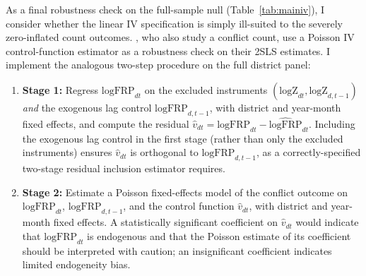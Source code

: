 \documentclass[12pt]{article}
\begin{document}
As a final robustness check on the full-sample null (Table~\ref{tab:mainiv}), I consider whether the linear IV specification is simply ill-suited to the severely zero-inflated count outcomes. \citet{lu2023fish}, who also study a conflict count, use a Poisson IV control-function estimator \citep{terzabasurathouz2008} as a robustness check on their 2SLS estimates. I implement the analogous two-step procedure on the full district panel:

\begin{enumerate}
    \item \textbf{Stage 1:} Regress $\text{logFRP}_{dt}$ on the excluded instruments $(\text{logZ}_{dt}, \text{logZ}_{d,t-1})$ \emph{and} the exogenous lag control $\text{logFRP}_{d,t-1}$, with district and year-month fixed effects, and compute the residual $\hat{v}_{dt} = \text{logFRP}_{dt} - \widehat{\text{logFRP}}_{dt}$. Including the exogenous lag control in the first stage (rather than only the excluded instruments) ensures $\hat{v}_{dt}$ is orthogonal to $\text{logFRP}_{d,t-1}$, as a correctly-specified two-stage residual inclusion estimator requires.
    \item \textbf{Stage 2:} Estimate a Poisson fixed-effects model of the conflict outcome on $\text{logFRP}_{dt}$, $\text{logFRP}_{d,t-1}$, and the control function $\hat{v}_{dt}$, with district and year-month fixed effects. A statistically significant coefficient on $\hat{v}_{dt}$ would indicate that $\text{logFRP}_{dt}$ is endogenous and that the Poisson estimate of its coefficient should be interpreted with caution; an insignificant coefficient indicates limited endogeneity bias.
\end{enumerate}
\end{document}
